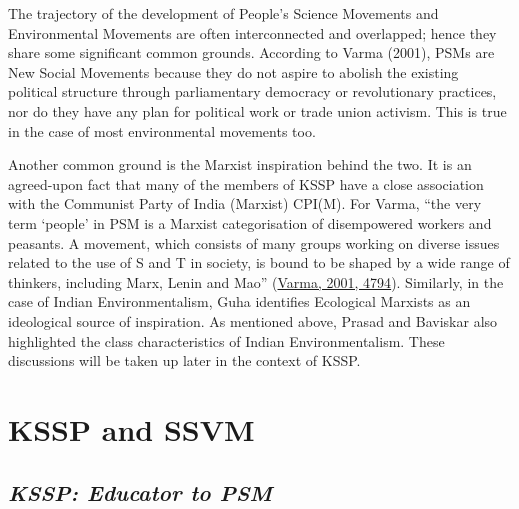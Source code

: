 \documentclass[twoside, 13pt]{article}
\begin{document}
{\fontsize{12}{14}\selectfont The trajectory of the development of People’s Science Movements and Environmental Movements are often interconnected and overlapped; hence they share some significant common grounds. According to Varma (2001), PSMs are New Social Movements because they do not aspire to abolish the existing political structure through parliamentary democracy or revolutionary practices, nor do they have any plan for political work or trade union activism. This is true in the case of most environmental movements too.


Another common ground is the Marxist inspiration behind the two. It is an agreed-upon fact that many of the members of KSSP have a close association with the Communist Party of India (Marxist) CPI(M). For Varma, “the very term ‘people’ in PSM is a Marxist categorisation of disempowered workers and peasants. A movement, which consists of many groups working on diverse issues related to the use of S and T in society, is bound to be shaped by a wide range of thinkers, including Marx, Lenin and Mao” (\underline{Varma, 2001, 4794}). Similarly, in the case of Indian Environmentalism, Guha identifies Ecological Marxists as an ideological source of inspiration. As mentioned above, Prasad and Baviskar also highlighted the class characteristics of Indian Environmentalism. These discussions will be taken up later in the context of KSSP. 


{\fontsize{18}{20}\selectfont\section*{KSSP and SSVM}}

\vspace{-.4cm}

{\fontsize{8}{10}\selectfont\subsection*{\textit{KSSP: Educator to PSM}}}

\vspace{-.1cm}

}
\end{document}
